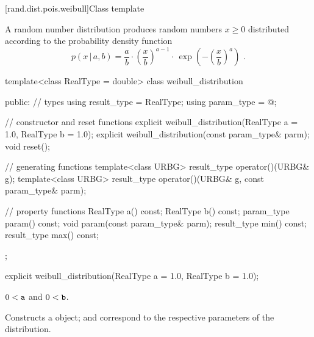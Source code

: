 
[rand.dist.pois.weibull]{Class template }%
%
%

\pnum
A  random number distribution
produces random numbers $x \geq 0$
distributed according to
the probability density function%
%
%
\[ p(x\,|\,a,b) = \frac{a}{b}
     \cdot \left(\frac{x}{b}\right)^{a-1}
     \cdot \, \exp\left( -\left(\frac{x}{b}\right)^a\right)
     \text{ .} \]

%
\begin{codeblock}
template<class RealType = double>
  class weibull_distribution {
  public:
    // types
    using result_type = RealType;
    using param_type  = @\unspec@;

    // constructor and reset functions
    explicit weibull_distribution(RealType a = 1.0, RealType b = 1.0);
    explicit weibull_distribution(const param_type& parm);
    void reset();

    // generating functions
    template<class URBG>
      result_type operator()(URBG& g);
    template<class URBG>
      result_type operator()(URBG& g, const param_type& parm);

    // property functions
    RealType a() const;
    RealType b() const;
    param_type param() const;
    void param(const param_type& parm);
    result_type min() const;
    result_type max() const;
  };
\end{codeblock}

%
\begin{itemdecl}
explicit weibull_distribution(RealType a = 1.0, RealType b = 1.0);
\end{itemdecl}%

\begin{itemdescr}
\pnum
\requires $0 < \texttt{a}$ and $0 < \texttt{b}$.

\pnum
\effects Constructs a  object;
 and 
correspond to the respective parameters of the distribution.
\end{itemdescr}

